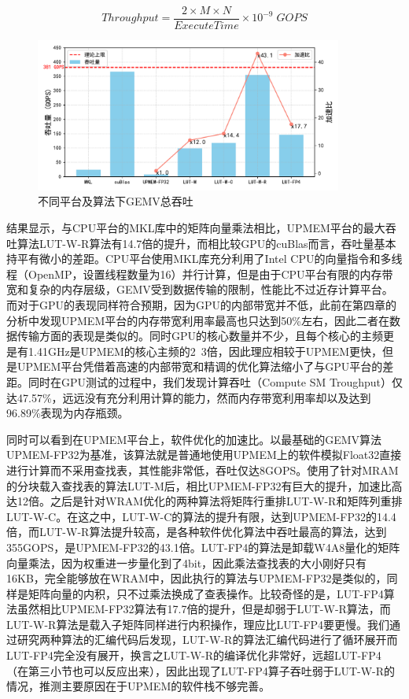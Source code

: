\begin{equation}
    Throughput=\frac{2\times M\times N}{ExecuteTime}\times 10^{-9}\; GOPS
    \label{GOPsEqu}
\end{equation}

\begin{figure}[!htbp]
    \centering
    \includegraphics[width=0.9\textwidth]{figures/Exp1-1.pdf}
    \caption{不同平台及算法下GEMV总吞吐}
	\label{EXP1-1}
\end{figure}

结果显示，与CPU平台的MKL库中的矩阵向量乘法相比，UPMEM平台的最大吞吐算法LUT-W-R算法有14.7倍的提升，而相比较GPU的cuBlas而言，吞吐量基本持平有微小的差距。CPU平台使用MKL库充分利用了Intel CPU的向量指令和多线程（OpenMP，设置线程数量为16）并行计算，但是由于CPU平台有限的内存带宽和复杂的内存层级，GEMV受到数据传输的限制，性能比不过近存计算平台。而对于GPU的表现同样符合预期，因为GPU的内部带宽并不低，此前在第四章的分析中发现UPMEM平台的内存带宽利用率最高也只达到50\%左右，因此二者在数据传输方面的表现是类似的。同时GPU的核心数量并不少，且每个核心的主频更是有1.41GHz是UPMEM的核心主频的2~3倍，因此理应相较于UPMEM更快，但是UPMEM平台凭借着高速的内部带宽和精调的优化算法缩小了与GPU平台的差距。同时在GPU测试的过程中，我们发现计算吞吐（Compute SM Troughput）仅达47.57\%，远远没有充分利用计算的能力，然而内存带宽利用率却以及达到96.89\%表现为内存瓶颈。

同时可以看到在UPMEM平台上，软件优化的加速比。以最基础的GEMV算法UPMEM-FP32为基准，该算法就是普通地使用UPMEM上的软件模拟Float32直接进行计算而不采用查找表，其性能非常低，吞吐仅达8GOPS。使用了针对MRAM的分块载入查找表的算法LUT-M后，相比UPMEM-FP32有巨大的提升，加速比高达12倍。之后是针对WRAM优化的两种算法将矩阵行重排LUT-W-R和矩阵列重排LUT-W-C。在这之中，LUT-W-C的算法的提升有限，达到UPMEM-FP32的14.4倍，而LUT-W-R算法提升较高，是各种软件优化算法中吞吐最高的算法，达到355GOPS，是UPMEM-FP32的43.1倍。LUT-FP4的算法是卸载W4A8量化的矩阵向量乘法，因为权重进一步量化到了4bit，因此乘法查找表的大小刚好只有16KB，完全能够放在WRAM中，因此执行的算法与UPMEM-FP32是类似的，同样是矩阵向量的内积，只不过乘法换成了查表操作。比较奇怪的是，LUT-FP4算法虽然相比UPMEM-FP32算法有17.7倍的提升，但是却弱于LUT-W-R算法，而LUT-W-R算法是载入子矩阵同样进行内积操作，理应比LUT-FP4要更慢。我们通过研究两种算法的汇编代码后发现，LUT-W-R的算法汇编代码进行了循环展开而LUT-FP4完全没有展开，换言之LUT-W-R的编译优化非常好，远超LUT-FP4（在第三小节也可以反应出来），因此出现了LUT-FP4算子吞吐弱于LUT-W-R的情况，推测主要原因在于UPMEM的软件栈不够完善。

